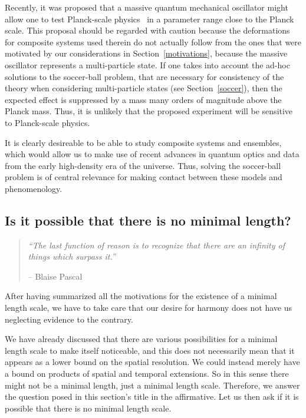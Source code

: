 \documentclass{article}
\begin{document}
Recently, it was proposed that a massive quantum mechanical oscillator might allow one to test
Planck-scale physics~\cite{Pikovski:2011zk} in a parameter range close to the Planck
scale. This proposal should
be regarded with caution because the deformations for composite systems used therein do
not actually follow from the ones that were motivated by our considerations in Section~\ref{motivations},
because the massive oscillator represents a multi-particle state.
If one takes into account the ad-hoc solutions to the soccer-ball problem, that are necessary for consistency 
of the theory when considering multi-particle states (see Section~\ref{soccer}), then the expected effect is suppressed 
by a mass many orders of magnitude above the Planck mass. Thus, it is unlikely that the proposed experiment 
will be sensitive  to Planck-scale physics.

It is clearly desireable to be able to study composite systems and ensembles, which
would allow us to make use of recent advances in quantum optics and data from the
early high-density era of the universe. Thus, solving the soccer-ball problem is of central
relevance for making contact between these models and phenomenology. 




\subsection{Is it possible that there is no minimal length?}

\begin{quote}
\textit{
``The last function of reason is to recognize that there are an infinity of things which surpass it.''}

-- Blaise Pascal
\end{quote}
%
After having summarized all the motivations for the existence of a minimal length scale, we have to
take care that our desire for harmony does not have us neglecting evidence to the contrary. 

We have already discussed that there are
various possibilities for a minimal length scale to make itself noticeable, and this does
not necessarily mean that it appears as a lower bound on the spatial resolution. We could
instead merely have a bound on products of spatial and temporal extensions. So in this sense
there might not be a minimal length, just a minimal length scale. Therefore,
we answer the question posed in this section's title in the affirmative. Let us
then ask if it is possible that there is no minimal length scale.
\end{document}
